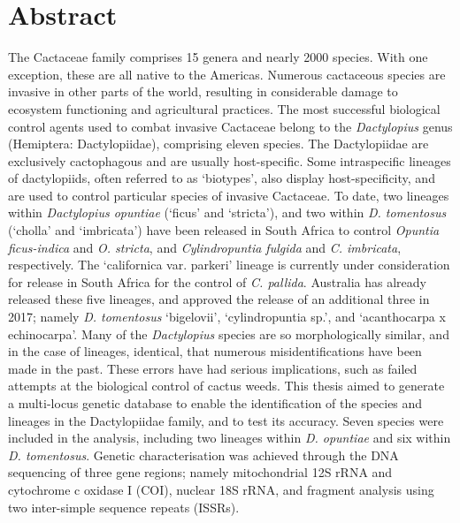 \chapter*{Abstract}

The Cactaceae family comprises 15 genera and nearly 2000 species. With one exception, these are all native to the Americas. Numerous cactaceous species are invasive in other parts of the world, resulting in considerable damage to ecosystem functioning and agricultural practices. The most successful biological control agents used to combat invasive Cactaceae belong to the \textit{Dactylopius} genus (Hemiptera: Dactylopiidae), comprising eleven species. 
The Dactylopiidae are exclusively cactophagous and are usually host-specific. Some  intraspecific lineages of dactylopiids, often referred to as `biotypes', also display host-specificity, and are used to control particular species of invasive Cactaceae. To date, two lineages within \textit{Dactylopius opuntiae} (`ficus' and `stricta'), and two within \textit{D. tomentosus} (`cholla' and `imbricata') have been released in South Africa to control \textit{Opuntia ficus-indica} and \textit{O. stricta}, and \textit{Cylindropuntia fulgida} and \textit{C. imbricata}, respectively. The `californica var. parkeri' lineage is currently under consideration for release in South Africa for the control of \textit{C. pallida}. Australia has already released these five lineages, and approved the release of an additional three in 2017; namely \textit{D. tomentosus} `bigelovii', `cylindropuntia sp.', and `acanthocarpa x echinocarpa'. 
Many of the \textit{Dactylopius} species are so morphologically similar, and in the case of lineages, identical, that numerous misidentifications have been made in the past. These errors have had serious implications, such as failed attempts at the biological control of cactus weeds. 
This thesis aimed to generate a multi-locus genetic database to enable the identification of the species and lineages in the Dactylopiidae family, and to test its accuracy. Seven species were included in the analysis, including two lineages within \textit{D. opuntiae} and six within \textit{D. tomentosus}. Genetic characterisation was achieved through the DNA sequencing of three gene regions; namely mitochondrial 12S rRNA and cytochrome c oxidase I (COI), nuclear 18S rRNA, and fragment analysis using two inter-simple sequence repeats (ISSRs). 
